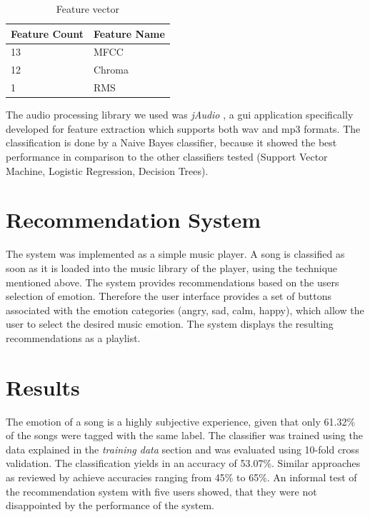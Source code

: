 \documentclass{sigchi-ext}
\begin{document}
\begin{table}
  \centering
  \begin{tabular}{@{}ll@{}}
    Feature Count & Feature Name \\ \midrule
    13 & MFCC \\
    12 & Chroma \\
    1  & RMS
  \end{tabular}
  \caption{Feature vector}
  \label{feature-vector}
\end{table}

The audio processing library we used was \textit{jAudio} \cite{McEnnis2005}, a gui application specifically developed for feature extraction which supports both wav and mp3 formats. The classification is done by a Naive Bayes classifier, because it showed the best performance in comparison to the other classifiers tested (Support Vector Machine, Logistic Regression, Decision Trees).

\section{Recommendation System}
The system was implemented as a simple music player. A song is classified as soon as it is loaded into the music library of the player, using the technique mentioned above. The system provides recommendations based on the users selection of emotion. Therefore the user interface provides a set of buttons associated with the emotion categories (angry, sad, calm, happy), which allow the user to select the desired music emotion. The system displays the resulting recommendations as a playlist.

\section{Results}
The emotion of a song is a highly subjective experience, given that only 61.32\% of the songs were tagged with the same label. The classifier was trained using the data explained in the \textit{training data} section and was evaluated using 10-fold cross validation. The classification yields in an accuracy of 53.07\%. Similar approaches as reviewed by \cite{Kim2010} achieve accuracies ranging from 45\% to 65\%. An informal test of the recommendation system with five users showed, that they were not disappointed by the performance of the system.
\end{document}
